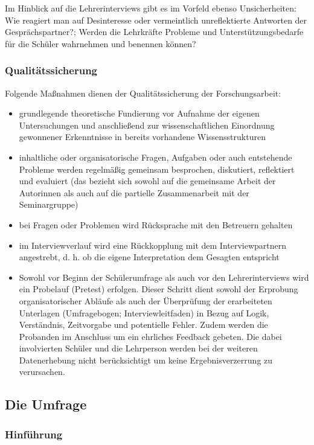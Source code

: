 Im Hinblick auf die Lehrerinterviews gibt es im Vorfeld ebenso Unsicherheiten: Wie reagiert man auf Desinteresse oder vermeintlich unreflektierte Antworten der Gesprächspartner?; Werden die Lehrkräfte Probleme und Unterstützungsbedarfe für die Schüler wahrnehmen und benennen können? 

\subsubsection{Qualitätssicherung}
\label{sec:Qualitätssicherung}

Folgende Maßnahmen dienen der Qualitätssicherung der Forschungsarbeit:
\begin{itemize}
	\item grundlegende theoretische Fundierung vor Aufnahme der eigenen Untersuchungen und anschließend zur wissenschaftlichen Einordnung gewonnener Erkenntnisse in bereits vorhandene Wissensstrukturen
	\item inhaltliche oder organisatorische Fragen, Aufgaben oder auch entstehende Probleme werden regelmäßig gemeinsam besprochen, diskutiert, reflektiert und evaluiert (das bezieht sich sowohl auf die gemeinsame Arbeit der Autorinnen als auch auf die partielle Zusammenarbeit mit der Seminargruppe)
	\item bei Fragen oder Problemen wird Rücksprache mit den Betreuern gehalten
	\item im Interviewverlauf wird eine Rückkopplung mit dem Interviewpartnern angestrebt, d. h. ob die eigene Interpretation dem Gesagten entspricht
	\item Sowohl vor Beginn der Schülerumfrage als auch vor den Lehrerinterviews wird ein Probelauf (Pretest) erfolgen. Dieser Schritt dient sowohl der Erprobung organisatorischer Abläufe als auch der Überprüfung der erarbeiteten Unterlagen (Umfragebogen; Interviewleitfaden) in Bezug auf Logik, Verständnis, Zeitvorgabe und potentielle Fehler. Zudem werden die Probanden im Anschluss um ein ehrliches Feedback gebeten. Die dabei involvierten Schüler und die Lehrperson werden bei der weiteren Datenerhebung nicht berücksichtigt um keine Ergebnisverzerrung zu verursachen.
\end{itemize}

\subsection{Die Umfrage}
\label{sec:DieUmfrage}

\subsubsection{Hinführung}
\label{sec:Hinführung}

